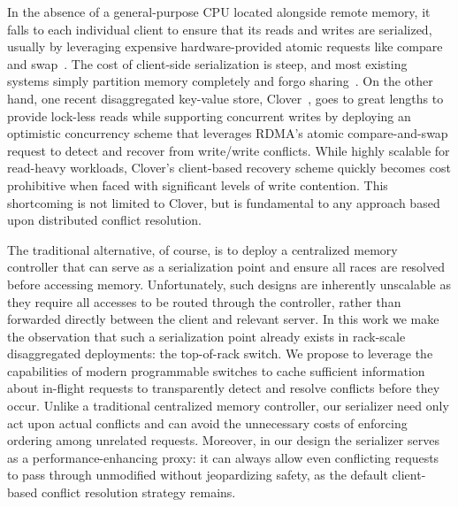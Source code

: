 

In the absence of a general-purpose CPU located alongside remote
memory, it falls to each individual client to ensure that its reads
and writes are serialized, usually by leveraging expensive
hardware-provided atomic requests like compare and
swap~\cite{design-guidelines,clover}.  The cost of client-side
serialization is steep, and most existing systems simply partition memory
completely and forgo sharing~\cite{reigons,fastswap, legoos}.  On the
other hand, one recent disaggregated key-value store,
Clover~\cite{clover}, goes to great lengths to provide lock-less reads
while supporting concurrent writes by deploying an optimistic
concurrency scheme that leverages RDMA's atomic compare-and-swap
request to detect and recover from write/write conflicts.  While
highly scalable for read-heavy workloads, Clover's client-based
recovery scheme quickly becomes cost prohibitive when faced with
significant levels of write contention.  This shortcoming is not
limited to Clover, but is fundamental to any approach based upon
distributed conflict resolution.


The traditional alternative, of course, is to deploy a centralized
memory controller that can serve as a serialization point and ensure
all races are resolved before accessing memory.  Unfortunately, such
designs are inherently unscalable as they require all accesses to be
routed through the controller, rather than forwarded directly between
the client and relevant server.  In this work we make the observation
that such a serialization point already exists in rack-scale
disaggregated deployments: the top-of-rack switch.  We propose to
leverage the capabilities of modern programmable switches to cache
sufficient information about in-flight requests to transparently
detect and resolve conflicts before they occur.  Unlike a traditional
centralized memory controller, our serializer need only act upon
actual conflicts and can avoid the unnecessary costs of enforcing
ordering among unrelated requests.  Moreover, in our design the
serializer serves as a performance-enhancing proxy: it can always
allow even conflicting requests to pass through unmodified without
jeopardizing safety, as the default client-based conflict resolution
strategy remains.

